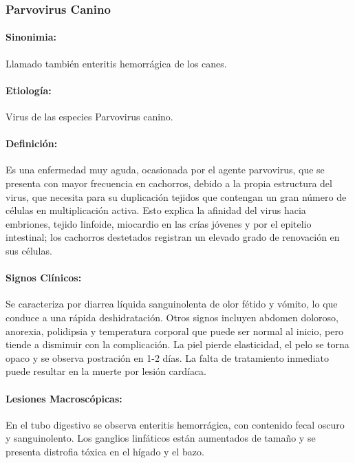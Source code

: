         \subsubsection{Parvovirus Canino}

            \paragraph{Sinonimia:} Llamado también enteritis hemorrágica de los canes.

            \paragraph{Etiología:} Virus de las especies Parvovirus canino.

            \paragraph{Definición:} Es una enfermedad muy aguda, ocasionada por el agente parvovirus, que se presenta con mayor frecuencia en cachorros, debido a la propia estructura del virus, que necesita para su duplicación tejidos que contengan un gran número de células en multiplicación activa. Esto explica la afinidad del virus hacia embriones, tejido linfoide, miocardio en las crías jóvenes y por el epitelio intestinal; los cachorros destetados registran un elevado grado de renovación en sus células.

            \paragraph{Signos Clínicos:} Se caracteriza por diarrea líquida sanguinolenta de olor fétido y vómito, lo que conduce a una rápida deshidratación. Otros signos incluyen abdomen doloroso, anorexia, polidipsia y temperatura corporal que puede ser normal al inicio, pero tiende a disminuir con la complicación. La piel pierde elasticidad, el pelo se torna opaco y se observa postración en 1-2 días. La falta de tratamiento inmediato puede resultar en la muerte por lesión cardíaca.

            \paragraph{Lesiones Macroscópicas:} En el tubo digestivo se observa enteritis hemorrágica, con contenido fecal oscuro y sanguinolento. Los ganglios linfáticos están aumentados de tamaño y se presenta distrofia tóxica en el hígado y el bazo.

